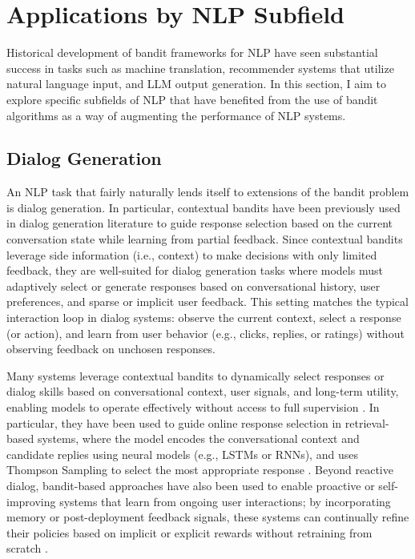 \documentclass[11pt]{article}
\begin{document}
\section{Applications by NLP Subfield}

Historical development of bandit frameworks for NLP have seen substantial success in tasks such as machine translation, recommender systems that utilize natural language input, and LLM output generation. In this section, I aim to explore specific subfields of NLP that have benefited from the use of bandit algorithms as a way of augmenting the performance of NLP systems.

\subsection{Dialog Generation}

An NLP task that fairly naturally lends itself to extensions of the bandit problem is dialog generation. In particular, contextual bandits have been previously used in dialog generation literature to guide response selection based on the current conversation state while learning from partial feedback. Since contextual bandits leverage side information (i.e., context) to make decisions with only limited feedback, they are well-suited for dialog generation tasks where models must adaptively select or generate responses based on conversational history, user preferences, and sparse or implicit user feedback. This setting matches the typical interaction loop in dialog systems: observe the current context, select a response (or action), and learn from user behavior (e.g., clicks, replies, or ratings) without observing feedback on unchosen responses.

Many systems leverage contextual bandits to dynamically select responses or dialog skills based on conversational context, user signals, and long-term utility, enabling models to operate effectively without access to full supervision \cite{upadhyay2019banditapproachposteriordialog}. In particular, they have been used to guide online response selection in retrieval-based systems, where the model encodes the conversational context and candidate replies using neural models (e.g., LSTMs or RNNs), and uses Thompson Sampling to select the most appropriate response \cite{customized-nonlinear-bandits-liu-2018}. Beyond reactive dialog, bandit-based approaches have also been used to enable proactive or self-improving systems that learn from ongoing user interactions; by incorporating memory or post-deployment feedback signals, these systems can continually refine their policies based on implicit or explicit rewards without retraining from scratch \citep{perez2018contextual, hancock-etal-2019-learning}.
\end{document}
